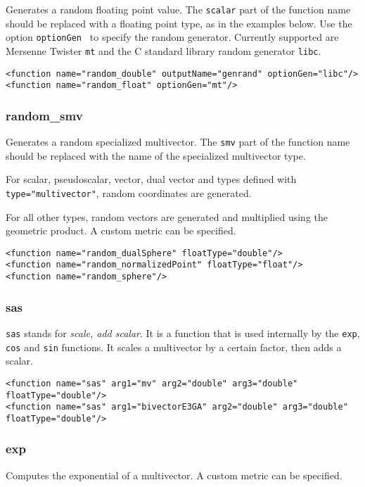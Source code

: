 \documentclass[10pt, a4paper]{article}
\begin{document}
Generates a random floating point value. The {\tt scalar} part of the function
name should be replaced with a floating point type, as in the examples below.
Use the option {\tt optionGen } to specify the random generator. Currently
supported are Mersenne Twister {\tt mt} and the C standard library random
generator {\tt libc}.
\begin{verbatim}
<function name="random_double" outputName="genrand" optionGen="libc"/>
<function name="random_float" optionGen="mt"/>
\end{verbatim}

\subsubsection*{random\_smv}

Generates a random specialized multivector. The {\tt smv} part of the function
name should be replaced with the name of the specialized multivector type.

For scalar, pseudoscalar, vector, dual vector and types defined with
{\tt type="multivector"}, random coordinates are generated.

For all other types, random vectors are generated and multiplied using the 
geometric product. A custom metric can be specified.
\begin{verbatim}
<function name="random_dualSphere" floatType="double"/>
<function name="random_normalizedPoint" floatType="float"/>
<function name="random_sphere"/>
\end{verbatim}

\subsubsection*{sas}

{\tt sas} stands for \emph{scale, add scalar}. 
It is a function that is used internally
by the {\tt exp}, {\tt cos} and {\tt sin} functions.
It scales a multivector by a certain factor, then adds a scalar.
\begin{verbatim}
<function name="sas" arg1="mv" arg2="double" arg3="double" floatType="double"/>
<function name="sas" arg1="bivectorE3GA" arg2="double" arg3="double" floatType="double"/>
\end{verbatim}

\subsubsection*{exp}

Computes the exponential of a multivector.
A custom metric can be specified.
\end{document}
